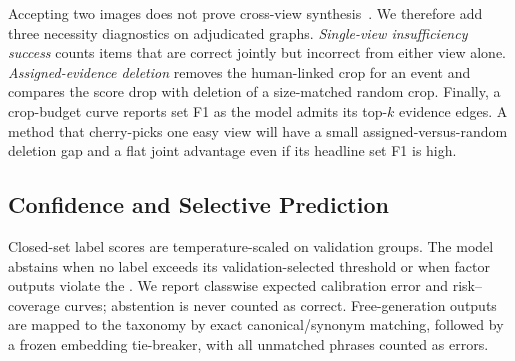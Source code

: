 Accepting two images does not prove cross-view synthesis~\cite{guo2026cvbench}. We therefore add three necessity diagnostics on adjudicated graphs. \emph{Single-view insufficiency success} counts items that are correct jointly but incorrect from either view alone. \emph{Assigned-evidence deletion} removes the human-linked crop for an event and compares the score drop with deletion of a size-matched random crop. Finally, a crop-budget curve reports set F1 as the model admits its top-$k$ evidence edges. A method that cherry-picks one easy view will have a small assigned-versus-random deletion gap and a flat joint advantage even if its headline set F1 is high.

\subsection{Confidence and Selective Prediction}

Closed-set label scores are temperature-scaled on validation groups. The model abstains when no label exceeds its validation-selected threshold or when factor outputs violate the \eventgraph. We report classwise expected calibration error and risk--coverage curves; abstention is never counted as correct. Free-generation outputs are mapped to the taxonomy by exact canonical/synonym matching, followed by a frozen embedding tie-breaker, with all unmatched phrases counted as errors.
